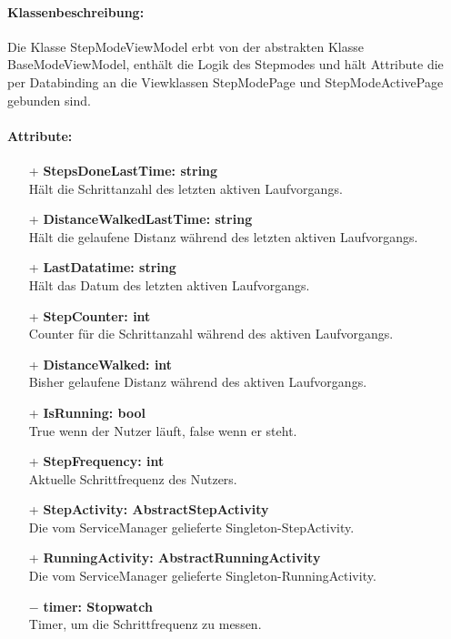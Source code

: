 \documentclass[a4paper,12pt]{article}
\begin{document}
\paragraph{Klassenbeschreibung:}
Die Klasse StepModeViewModel erbt von der abstrakten Klasse BaseModeViewModel, enthält die Logik des Stepmodes  und hält Attribute die per Databinding an die Viewklassen StepModePage und StepModeActivePage gebunden sind. 
\paragraph{Attribute:}
\begin{itemize}
	\item[+] \textbf{StepsDoneLastTime: string} \\ Hält die Schrittanzahl des letzten aktiven Laufvorgangs. 
	\item[+] \textbf{DistanceWalkedLastTime: string} \\ Hält die gelaufene Distanz während des letzten aktiven Laufvorgangs. 
	\item[+] \textbf{LastDatatime: string} \\ Hält das Datum des letzten aktiven Laufvorgangs. 
	\item[+] \textbf{StepCounter: int} \\ Counter für die Schrittanzahl während des aktiven Laufvorgangs. 
	\item[+] \textbf{DistanceWalked: int} \\  Bisher gelaufene Distanz während des aktiven Laufvorgangs.
	\item[+] \textbf{IsRunning: bool} \\ True wenn der Nutzer läuft, false wenn er steht. 
	\item[+] \textbf{StepFrequency: int} \\ Aktuelle Schrittfrequenz des Nutzers.
	\item[+] \textbf{StepActivity: AbstractStepActivity} \\ Die vom ServiceManager gelieferte Singleton-StepActivity.
	\item[+] \textbf{RunningActivity: AbstractRunningActivity} \\ Die vom ServiceManager gelieferte Singleton-RunningActivity.
	\item[$-$] \textbf{timer: Stopwatch} \\ Timer, um die Schrittfrequenz zu messen.

\end{itemize}
\end{document}
